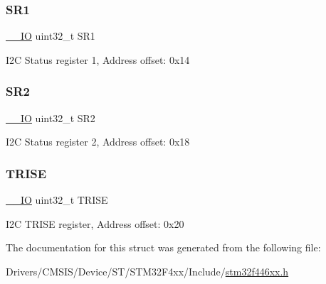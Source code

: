 \subsubsection{\texorpdfstring{S\+R1}{SR1}}
{\footnotesize\ttfamily \mbox{\hyperlink{core__sc300_8h_aec43007d9998a0a0e01faede4133d6be}{\+\_\+\+\_\+\+IO}} uint32\+\_\+t S\+R1}

I2C Status register 1, Address offset\+: 0x14 \mbox{\label{struct_i2_c___type_def_a89623ee198737b29dc0a803310605a83}} 
\subsubsection{\texorpdfstring{S\+R2}{SR2}}
{\footnotesize\ttfamily \mbox{\hyperlink{core__sc300_8h_aec43007d9998a0a0e01faede4133d6be}{\+\_\+\+\_\+\+IO}} uint32\+\_\+t S\+R2}

I2C Status register 2, Address offset\+: 0x18 \mbox{\label{struct_i2_c___type_def_a5d5764c0ec44b661da957e6343f9e7b5}} 
\subsubsection{\texorpdfstring{T\+R\+I\+SE}{TRISE}}
{\footnotesize\ttfamily \mbox{\hyperlink{core__sc300_8h_aec43007d9998a0a0e01faede4133d6be}{\+\_\+\+\_\+\+IO}} uint32\+\_\+t T\+R\+I\+SE}

I2C T\+R\+I\+SE register, Address offset\+: 0x20 

The documentation for this struct was generated from the following file\+:\begin{DoxyCompactItemize}
\item 
Drivers/\+C\+M\+S\+I\+S/\+Device/\+S\+T/\+S\+T\+M32\+F4xx/\+Include/\mbox{\hyperlink{stm32f446xx_8h}{stm32f446xx.\+h}}\end{DoxyCompactItemize}
